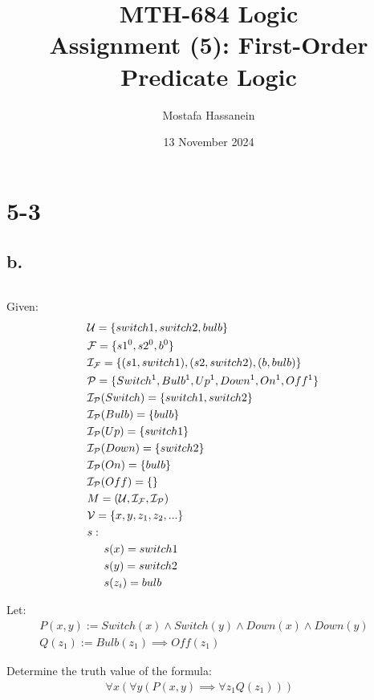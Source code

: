 \documentclass{article}
\author{Mostafa Hassanein}
\title{
  MTH-684 Logic \\
  Assignment (5): First-Order Predicate Logic}
\date{13 November 2024}
\begin{document}
\maketitle
\newpage

\section*{5-3}
\subsection*{b.}
$ $

Given:
\begin{align*}
  &\mathcal{U} = \{ switch1, switch2, bulb \} &&\\
  &\mathcal{F} = \{ s1^0, s2^0, b^0 \} &&\\
  &\mathcal{I_F} = \{ (s1, switch1), (s2, switch2), (b, bulb) \} &&\\
  &\mathcal{P} = \{ Switch^1, Bulb^1, Up^1, Down^1, On^1, Off^1 \} &&\\
  &\mathcal{I_P}(Switch) = \{ switch1, switch2 \} &&\\
  &\mathcal{I_P}(Bulb) = \{ bulb \} &&\\
  &\mathcal{I_P}(Up) = \{ switch1 \} &&\\
  &\mathcal{I_P}(Down) = \{ switch2 \} &&\\
  &\mathcal{I_P}(On) = \{ bulb \} &&\\
  &\mathcal{I_P}(Off) = \{ \} &&\\
  &M = (\mathcal{U}, \mathcal{I_F}, \mathcal{I_P}) &&\\
  &\mathcal{V} = \{ x, y, z_1, z_2, ... \} &&\\
  &s: &&\\ 
  &\text{\indent} s(x) =  switch1 &&\\
  &\text{\indent} s(y) =  switch2 &&\\
  &\text{\indent} s(z_i) =  bulb
\end{align*}

Let: 
\begin{align*}
  &P(x,y) := Switch(x) \land Switch(y) \land Down(x) \land Down(y) &&\\ 
  &Q(z_1) := Bulb(z_1) \implies Off(z_1) 
\end{align*}


Determine the truth value of the formula:
\begin{align*}
  \forall x (
    \forall y
    (
      P(x,y) 
      \implies
      \forall z_1 Q(z_1)
    )
  ) &&
\end{align*}
\newline
\end{document}
